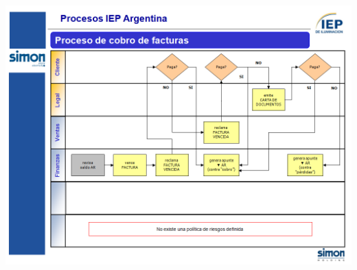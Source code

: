 \begin{center}
 \includegraphics[angle=90,scale=0.80,keepaspectratio=true]{./Images/Procesos-Circuitos-Originales-IEP/Circuito-Cobranzas-IEP.PNG}
\end{center}
